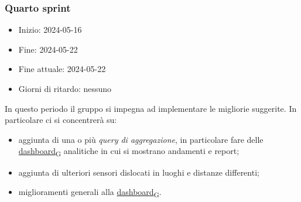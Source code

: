 \newpage
\subsubsection{Quarto sprint}
\begin{itemize}
	\item Inizio: 2024-05-16
	\item Fine: 2024-05-22
	\item Fine attuale: 2024-05-22
	\item Giorni di ritardo: nessuno
\end{itemize}

In questo periodo il gruppo si impegna ad implementare le migliorie suggerite.
In particolare ci si concentrerà su:
\begin{itemize}
	\item aggiunta di una o più \textit{query di aggregazione}, in particolare fare delle \href{https://7last.github.io/docs/rtb/documentazione-interna/glossario\#dashboard}{dashboard\textsubscript{G}} analitiche in cui si
	      mostrano andamenti e report;
	\item aggiunta di ulteriori sensori dislocati in luoghi e distanze differenti;
	\item miglioramenti generali alla \href{https://7last.github.io/docs/rtb/documentazione-interna/glossario\#dashboard}{dashboard\textsubscript{G}}.
\end{itemize}

